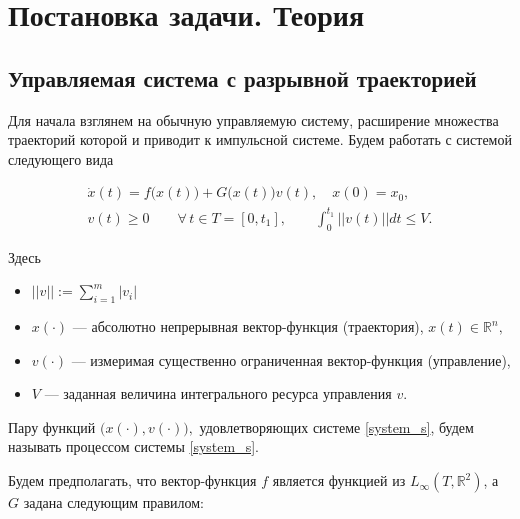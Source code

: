 \section{Постановка задачи. Теория}
\label{sec:theory}

\subsection {Управляемая система с разрывной траекторией}
\label{sec:csdisttrack}

Для начала взглянем на обычную управляемую систему, расширение
множества траекторий которой и приводит к импульсной системе. Будем
работать с системой следующего вида

\begin{equation}
  \label{system_s}
  \begin{array}{l}
    \dot{x}(t)=f\big(x(t)\big)+G\big(x(t)\big)v(t), \quad x(0)=x_0, \\[8pt]
    v(t)\geq 0  \qquad \forall\, t\in T = [0,t_1], \qquad
    \displaystyle\int_{0}^{t_1} ||v(t)||dt\leq V.
  \end{array} \tag{$S$}
\end{equation}

Здесь
\begin{itemize}
  \item $||v||:=\displaystyle\sum_{i=1}^m |v_i|$
  \item $x(\cdot)$ --- абсолютно непрерывная вектор-функция
    (траектория), $x(t)\in {\mathbb R}^n,$
  \item $v(\cdot)$ --- измеримая существенно ограниченная
    вектор-функция (управление),
  
  \item $V$ --- заданная величина интегрального ресурса управления
    $v$.
\end{itemize}

Пару функций $\bigl(x(\cdot),v(\cdot)\bigr),$ удовлетворяющих
системе \eqref{system_s}, будем называть процессом системы \eqref{system_s}.

Будем предполагать, что вектор-функция $f$ является функцией из
$L_{\infty}(T,\mathbb{R}^2)$, а $G$ задана следующим правилом:

